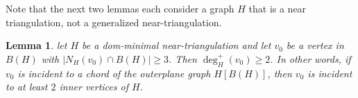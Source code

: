 \documentclass[12pt]{article}
\newtheorem{lem}{Lemma}
\newenvironment{clmproof}{\noindent\emph{Proof of Claim:}}{\hfill{$\blacksquare$}\par}
\newcommand{\defin}[1]{\emph{\textcolor{Maroon}{#1}}}
\theoremstyle{definition}
\newcommand{\pat}[1]{[\textcolor{red}{PM: #1}]}
\begin{document}
%

%
%
%


Note that the next two lemmas each consider a graph $H$ that is a near triangulation, not a generalized near-triangulation.

\begin{lem}\label{chord_incident}
  let $H$ be a dom-minimal near-triangulation and let $v_0$ be a vertex in $B(H)$ with $|N_H(v_0)\cap B(H)|\ge 3$.  Then $\deg^+_H(v_0)\ge 2$.  In other words, if $v_0$ is incident to a chord of the outerplane graph $H[B(H)]$, then $v_0$ is incident to at least $2$ inner vertices of $H$.
\end{lem}
\end{document}
